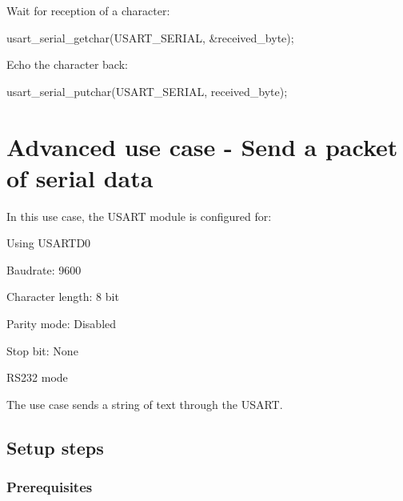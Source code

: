 \begin{DoxyEnumerate}
\item Wait for reception of a character\-:
\begin{DoxyItemize}
\item 
\begin{DoxyCode}
 usart\_serial\_getchar(USART\_SERIAL, &received\_byte); 
\end{DoxyCode}

\end{DoxyItemize}
\item Echo the character back\-:
\begin{DoxyItemize}
\item 
\begin{DoxyCode}
 usart\_serial\_putchar(USART\_SERIAL, received\_byte); 
\end{DoxyCode}
 
\end{DoxyItemize}
\end{DoxyEnumerate}\hypertarget{serial_use_case_1}{}\section{Advanced use case -\/ Send a packet of serial data}\label{serial_use_case_1}
In this use case, the U\-S\-A\-R\-T module is configured for\-:
\begin{DoxyItemize}
\item Using U\-S\-A\-R\-T\-D0
\item Baudrate\-: 9600
\item Character length\-: 8 bit
\item Parity mode\-: Disabled
\item Stop bit\-: None
\item R\-S232 mode
\end{DoxyItemize}

The use case sends a string of text through the U\-S\-A\-R\-T.\hypertarget{serial_use_case_1_serial_use_case_1_setup}{}\subsection{Setup steps}\label{serial_use_case_1_serial_use_case_1_setup}
\hypertarget{serial_use_case_1_serial_use_case_1_setup_prereq}{}\subsubsection{Prerequisites}\label{serial_use_case_1_serial_use_case_1_setup_prereq}

